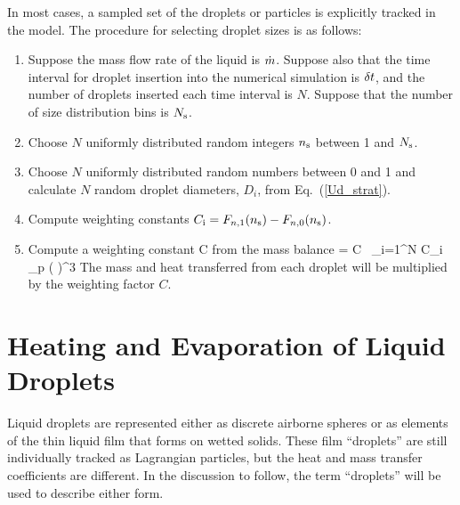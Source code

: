 In most cases, a sampled set of the droplets or particles is explicitly tracked in the model.
The procedure for selecting droplet sizes is as follows: 
\begin{enumerate}
\item Suppose the mass flow rate of the liquid is $\dot{m}$.
Suppose also that the time interval for droplet insertion into the numerical simulation is $\delta t$, and the number of droplets
inserted each time interval is $N$. Suppose that the number of size distribution bins is $N_{\rm s}$. 
\item Choose $N$ uniformly distributed random integers $n_{\rm s}$ between 1 and $N_{\rm s}$.
\item Choose $N$ uniformly distributed random numbers between 0 and 1 and calculate $N$ random droplet diameters, $D_i$, from Eq.~(\ref{Ud_strat}).
\item Compute weighting constants $C_{\rm i} = F_{n,1}(n_{\rm s}) - F_{n,0}(n_{\rm s})$.
\item Compute a weighting constant C from the mass balance
\be \dm \; \dt = C \, \sum_{i=1}^N \; C_i \;  \pi \rho_{\rm p}
      \left(  \right)^3 \ee
The mass and heat transferred from each droplet will be multiplied by the weighting factor $C$.
\end{enumerate}


\section{Heating and Evaporation of Liquid Droplets}

Liquid droplets are represented either as discrete airborne spheres or as elements of the thin liquid film that forms on wetted solids. These film ``droplets'' are still individually tracked as Lagrangian particles, but the heat and mass transfer coefficients are different. In the discussion to follow, the term ``droplets'' will be used to describe either form.

